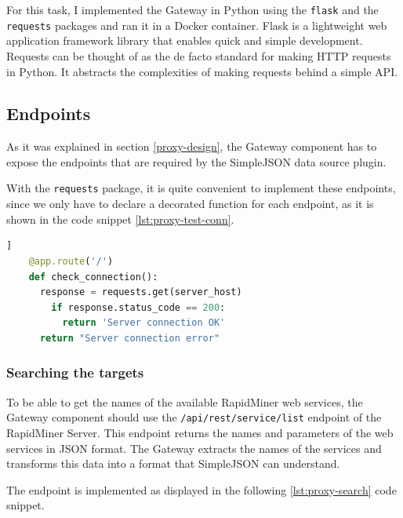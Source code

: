 For this task, I implemented the Gateway in Python using the \texttt{flask}\cite{flask} and the \texttt{requests}\cite{requests} packages and ran it in a Docker container. Flask is a lightweight web application framework library that enables quick and simple development. Requests can be thought of as the de facto standard for making HTTP requests in Python. It abstracts the complexities of making requests behind a simple API.

\subsection{Endpoints}

As it was explained in section \ref{proxy-design}, the Gateway component has to expose the endpoints that are required by the SimpleJSON data source plugin.

With the \texttt{requests} package, it is quite convenient to implement these endpoints, since we only have to declare a decorated function for each endpoint, as it is shown in the code snippet \ref{lst:proxy-test-conn}.

\vspace{0.5cm}
\begin{minipage}{\linewidth}
\begin{lstlisting}[language=Python, caption={Test the connection to the server}, label={lst:proxy-test-conn}]]
	@app.route('/')
	def check_connection():
	  response = requests.get(server_host)
	    if response.status_code == 200:
	      return 'Server connection OK'
	  return "Server connection error"
\end{lstlisting}
\end{minipage}
\subsubsection{Searching the targets}

To be able to get the names of the available RapidMiner web services, the Gateway component should use the \texttt{/api/rest/service/list} endpoint of the RapidMiner Server. This endpoint returns the names and parameters of the web services in JSON format. The Gateway extracts the names of the services and transforms this data into a format that SimpleJSON can understand.

The endpoint is implemented as displayed in the following \ref{lst:proxy-search} code snippet. 

